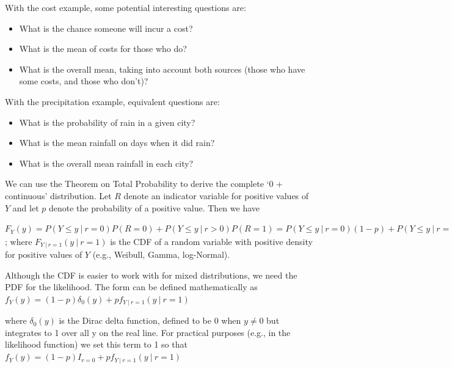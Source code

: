 \documentclass[
  9pt,
  ignorenonframetext,
]{beamer}
\begin{document}
\begin{frame}{}
\protect\hypertarget{section}{}
With the cost example, some potential interesting questions are:

\begin{itemize}
\item
  What is the chance someone will incur a cost?
\item
  What is the mean of costs for those who do?
\item
  What is the overall mean, taking into account both sources (those who
  have some costs, and those who don't)?
\end{itemize}

\vspace{\baselineskip}

With the precipitation example, equivalent questions are:

\begin{itemize}
\item
  What is the probability of rain in a given city?
\item
  What is the mean rainfall on days when it did rain?
\item
  What is the overall mean rainfall in each city?
\end{itemize}
\end{frame}

\begin{frame}{}
\protect\hypertarget{section-1}{}
We can use the Theorem on Total Probability to derive the complete `0 +
continuous' distribution. Let \(R\) denote an indicator variable for
positive values of \(Y\) and let \(p\) denote the probability of a
positive value. Then we have

\(F_Y (y)=P(Y \leq y\ |\ r=0)P(R=0)+P(Y \leq y\ |\ r>0)P(R=1) =P(Y \leq y\ |\ r=0) (1-p)+P(Y \leq y\ |\ r=1) p =(1-p) I_{y=0}+p F_{Y\ |\ r=1} (y\ |\ r=1)\);
where \(F_{Y\ |\ r=1} (y\ |\ r=1)\) is the CDF of a random variable with
positive density for positive values of \(Y\) (e.g., Weibull, Gamma,
log-Normal).

Although the CDF is easier to work with for mixed distributions, we need
the PDF for the likelihood. The form can be defined mathematically as
\(f_Y (y)=(1-p) \delta_0 (y)+p f_{Y\ |\ r=1} (y\ |\ r=1)\)

where \(\delta_0 (y)\) is the Dirac delta function, defined to be 0 when
\(y \neq 0\) but integrates to 1 over all y on the real line. For
practical purposes (e.g., in the likelihood function) we set this term
to 1 so that \(f_Y (y)=(1-p) I_{r=0}+p f_{Y\ |\ r=1} (y\ |\ r=1)\)
\end{frame}
\end{document}
